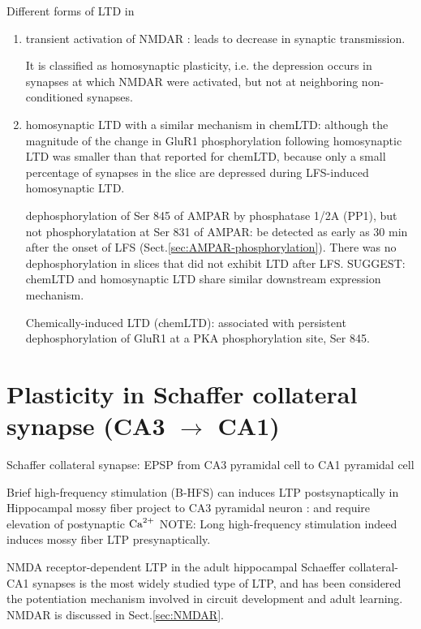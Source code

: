 Different forms of LTD in 
\begin{enumerate}
  \item transient activation of NMDAR : leads to decrease in synaptic
  transmission.
  
  It is classified as homosynaptic plasticity, i.e. the depression occurs in
  synapses at which NMDAR were activated, but not at neighboring non-conditioned
  synapses.
    
  \item homosynaptic LTD with a similar mechanism in chemLTD: \citep{lee2000pab}
  although the magnitude of the change in GluR1 phosphorylation following
  homosynaptic LTD was smaller than that reported for chemLTD, because only a
  small percentage of synapses in the slice are depressed during LFS-induced
  homosynaptic LTD.
  
  dephosphorylation of Ser 845 of AMPAR by phosphatase 1/2A (PP1), but not
  phosphorylatation at Ser 831 of AMPAR: be detected as early as 30 min after the onset of LFS
  (Sect.\ref{sec:AMPAR-phosphorylation}). There was no dephosphorylation in
  slices that did not exhibit LTD after LFS. SUGGEST: chemLTD and homosynaptic
  LTD share similar downstream expression mechanism. 
  
\begin{mdframed}

Chemically-induced LTD (chemLTD): associated with persistent
dephosphorylation of GluR1 at a PKA phosphorylation site, Ser 845.
\end{mdframed}
  
\end{enumerate}

\section{Plasticity in Schaffer collateral synapse (CA3 $\rightarrow$ CA1)}
\label{sec:synaptic-plasticity-CA3-to-CA1}

Schaffer collateral synapse: EPSP from CA3 pyramidal cell to CA1 pyramidal cell

Brief high-frequency stimulation (B-HFS) can induces LTP postsynaptically in
Hippocampal mossy fiber project to CA3 pyramidal neuron  \citep{kapur1998}: and require elevation of postynaptic ${\text{Ca}^{2+}}$ 
NOTE: Long high-frequency stimulation indeed  induces mossy fiber LTP
presynaptically.

NMDA receptor-dependent LTP in the adult hippocampal Schaeffer collateral-CA1
synapses is the most widely studied type of LTP,  and has been considered the
potentiation mechanism involved in circuit development and adult learning. NMDAR
is discussed in Sect.\ref{sec:NMDAR}.


